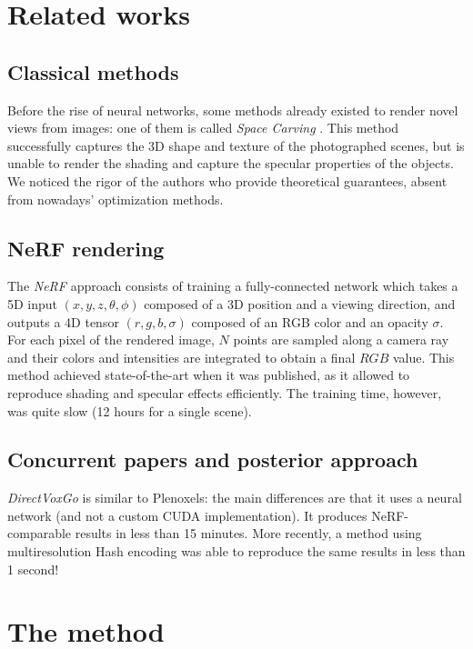 \documentclass{article}
\begin{document}
\section{Related works}



\subsection{Classical methods}

Before the rise of neural networks, some methods already existed to render novel views from images: one of them is called \textit{Space Carving} \cite{spacecarving}. This method successfully captures the 3D shape and texture of the photographed scenes, but is unable to render the shading and capture the specular properties of the objects. We noticed the rigor of the authors who provide theoretical guarantees, absent from nowadays' optimization methods.

\subsection{NeRF rendering}

The \textit{NeRF} \cite{nerf} approach consists of training a fully-connected network which takes a 5D input $(x,y,z,\theta,\phi)$ composed of a 3D position and a viewing direction, and outputs a 4D tensor $(r, g, b, \sigma)$ composed of an RGB color and an opacity $\sigma$. For each pixel of the rendered image, $N$ points are sampled along a camera ray and their colors and intensities are integrated to obtain a final $RGB$ value. This method achieved state-of-the-art when it was published, as it allowed to reproduce shading and specular effects efficiently. The training time, however, was quite slow (12 hours for a single scene).

\subsection{Concurrent papers and posterior approach}

\textit{DirectVoxGo} \cite{directvoxgo} is similar to Plenoxels: the main differences are that it uses a neural network (and not a custom CUDA implementation). It produces NeRF-comparable results in less than 15 minutes. More recently, a method using multiresolution Hash encoding \cite{instant} was able to reproduce the same results in less than 1 second!

\section{The method}
\end{document}
